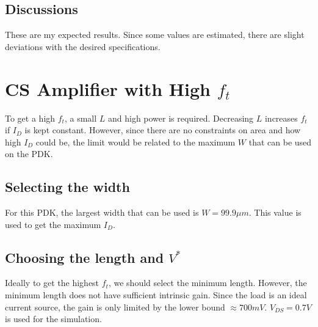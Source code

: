 \documentclass[conference]{IEEEtran}
\begin{document}
\subsection{Discussions}
These are my expected results. Since some values are estimated, there are slight deviations with the desired specifications. 

\vspace{8pt}
\section{CS Amplifier with High $f_t$} 
To get a high $f_t$, a small $L$ and high power is required. Decreasing $L$ increases $f_t$ if $I_D$ is kept constant. However, since there are no constraints on area and how high $I_D$ could be, the limit would be related to the maximum $W$ that can be used on the PDK. 

\subsection{Selecting the width}
For this PDK, the largest width that can be used is $W=99.9\mu m$. This value is used to get the maximum $I_D$. 

\newpage 
\subsection{Choosing the length and $V^*$}
Ideally to get the highest $f_t$, we should select the minimum length. However, the minimum length does not have sufficient intrinsic gain. Since the load is an ideal current source, the gain is only limited by the lower bound $\approx 700mV$. $V_{DS}=0.7V$ is used for the simulation. 

\vspace{8pt}
\end{document}
